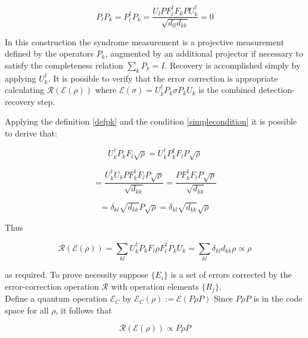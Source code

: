 \documentclass{article}
\begin{document}
\begin{equation}
	P_l P_k = P_l^\dagger P_k = \dfrac{U_l P F_l^\dagger F_k P U_k^\dagger}{\sqrt{d_{ll}d_{kk}}} = 0
\end{equation}

In this construction the syndrome measurement is a projective measurement defined by
the operators $P_k$, augmented by an additional projector if necessary to satisfy
the completeness relation $\sum_k P_k = I$.
Recovery is accomplished simply by applying $U_k^\dagger$.
It is possible to verify that the error correction is appropriate calculating
$ \mathcal{R}(\mathcal{E}(\rho)) $ where $\mathcal{E}(\sigma) = U_k^\dagger P_k \sigma P_k U_k$
is the combined detection-recovery step.

Applying the definition \ref{defpk} and the condition \ref{simplecondition}
it is possible to derive that:

\begin{equation}
	U_k^\dagger P_k F_l \sqrt{\rho} = U_k^\dagger P_k^\dagger F_l P \sqrt{\rho}
\end{equation}

\begin{equation}
	=	\dfrac{U_k^\dagger U_k P F_k^\dagger F_l P \sqrt{\rho}}{\sqrt{d_{kk}}} = \dfrac{P F_k^\dagger F_l P \sqrt{\rho}}{\sqrt{d_{kk}}}
\end{equation}

\begin{equation}
	\label{conditionauxilary}
	= \delta_{kl} \sqrt{d_{kk}} P \sqrt{\rho} = \delta_{kl} \sqrt{d_{kk}} \sqrt{\rho}
\end{equation}

Thus

\begin{equation}
	\mathcal{R}(\mathcal{E}(\rho)) = \sum_{kl} U_k^\dagger P_k F_l \rho F_l^\dagger P_k U_k = \sum_{kl} \delta_{kl} d_{kk} \rho \propto \rho
\end{equation}

as required.
\vspace{20pt}
To prove necessity suppose $\{E_i\}$ is a set of errors corrected by the error-correction
operation $\mathcal{R}$ with operation elements $\{R_j\}$.\\
Define a quantum operation $\mathcal{E}_C$ by $\mathcal{E}_C(\rho) := \mathcal{E}(P \rho P)$
Since $P \rho P$ is in the code space for all $\rho$, it follows that

\begin{equation}
	\mathcal{R}(\mathcal{E}(\rho)) \propto P \rho P
\end{equation}
\end{document}
